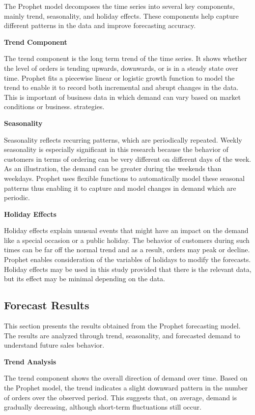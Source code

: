 The Prophet model decomposes the time series into several key components, mainly trend, seasonality, and holiday effects. These components help capture different patterns in the data and improve forecasting accuracy.

\textbf{Trend Component}

The trend component is the long term trend of the time series. It shows
whether the level of orders is tending upwards, downwards, or is in a steady state over time. Prophet fits a piecewise linear or logistic growth function to model the trend to enable it to record both incremental and abrupt changes in the data. This is important of business data in which demand can vary based on market conditions or business.
strategies.

\textbf{Seasonality}

Seasonality reflects recurring patterns, which are periodically repeated. Weekly seasonality is especially significant in this research because the behavior of customers in terms of ordering can be very different on different days of the week. As an illustration, the demand can be greater during the weekends than weekdays. Prophet uses flexible functions to automatically model these seasonal patterns thus enabling it to capture and model changes in demand which are periodic.

\textbf{Holiday Effects}

Holiday effects explain unusual events that might have an impact on the demand like a special occasion or a public holiday. The behavior of customers during such times can be far off the normal trend and as a result, orders may peak or decline. Prophet enables consideration of the variables of holidays to modify the forecasts. Holiday effects may be used in this study provided that there is the relevant data, but its effect may be minimal depending on the data.


\subsection{Forecast Results}

This section presents the results obtained from the Prophet forecasting model. The results are analyzed through trend, seasonality, and forecasted demand to understand future sales behavior.

\textbf{Trend Analysis}

The trend component shows the overall direction of demand over time. Based on the Prophet model, the trend indicates a slight downward pattern in the number of orders over the observed period. This suggests that, on average, demand is gradually decreasing, although short-term fluctuations still occur.

